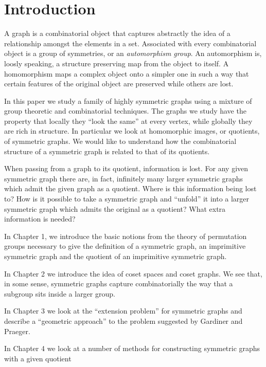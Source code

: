 \chapter*{Introduction}


A graph is a combinatorial object that captures abstractly 
the idea of a relationship amongst the elements in a set.
Associated with every combinatorial object is a group of symmetries, 
or an \emph{automorphism group}.
An automorphism is, loosly speaking, a structure preserving map from the object to itself.
A homomorphism maps a complex object onto a simpler one
in such a way that certain features of the original object are preserved
while others are lost.

In this paper we study a family of highly symmetric graphs
using a mixture of group theoretic and combinatorial techniques.
The graphs we study have the property that locally
they ``look the same'' at every vertex, 
while globally they are rich in structure.
In particular we look at homomorphic images, 
or quotients, of symmetric graphs. 
We would like to understand how the combinatorial structure of a
symmetric graph is related to that of its quotients.

When passing from a graph to its quotient, information is lost.
For any given symmetric graph there are, in fact, infinitely many
larger symmetric graphs which admit the given graph as a quotient.
Where is this information being lost to?
How is it possible to take a symmetric graph and ``unfold''
it into a larger symmetric graph which
admits the original as a quotient?
What extra information is needed?
\hfill \break

In Chapter 1, we introduce the basic notions from the theory of
permutation groups necessary to give the definition of
a symmetric graph, an imprimitive symmetric graph
and the quotient of an imprimitive symmetric graph.

In Chapter 2 we introduce the idea of coset spaces and coset graphs. 
We see that, in some sense, 
symmetric graphs capture combinatorially
the way that a subgroup sits inside a larger group.

In Chapter 3 we look at the ``extension problem''
for symmetric graphs and describe a ``geometric approach''
to the problem suggested by Gardiner and Praeger.

In Chapter 4 we look at a number of methods
for constructing symmetric graphs with a given quotient



